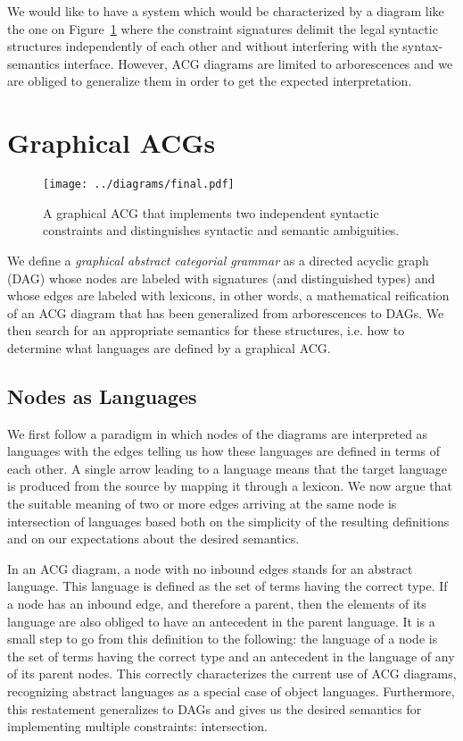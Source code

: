 \documentclass{llncs}
\begin{document}
We would like to have a system which would be characterized by a diagram like
the one on Figure~\ref{fig:gacg} where the constraint signatures delimit the
legal syntactic structures independently of each other and without interfering
with the syntax-semantics interface. However, ACG diagrams are limited to
arborescences and we are obliged to generalize them in order to get
the expected interpretation.


\section{Graphical ACGs}

\begin{figure}
  \centering
  \texttt{[image: ../diagrams/final.pdf]}
  \caption{\label{fig:gacg} A graphical ACG that implements two
      independent syntactic constraints and distinguishes syntactic and
      semantic ambiguities.}
\end{figure}

We define a \emph{graphical abstract categorial grammar} as a directed acyclic
graph (DAG) whose nodes are labeled with signatures (and distinguished types)
and whose edges are labeled with lexicons, in other words, a mathematical
reification of an ACG diagram that has been generalized from arborescences to
DAGs. We then search for an appropriate semantics for these structures,
i.e. how to determine what languages are defined by a graphical ACG.

\subsection{Nodes as Languages}

We first follow a paradigm in which nodes of the diagrams are interpreted as
languages with the edges telling us how these languages are defined in terms
of each other. A single arrow leading to a language means that the target
language is produced from the source by mapping it through a lexicon. We now
argue that the suitable meaning of two or more edges arriving at the same node
is intersection of languages based both on the simplicity of the resulting
definitions and on our expectations about the desired semantics.

In an ACG diagram, a node with no inbound edges stands for an abstract
language. This language is defined as the set of terms having the correct
type. If a node has an inbound edge, and therefore a parent, then the elements
of its language are also obliged to have an antecedent in the parent
language. It is a small step to go from this definition to the following: the
language of a node is the set of terms having the correct type and an
antecedent in the language of any of its parent nodes. This correctly
characterizes the current use of ACG diagrams, recognizing abstract languages
as a special case of object languages. Furthermore, this restatement
generalizes to DAGs and gives us the desired semantics for implementing
multiple constraints: intersection.
\end{document}
